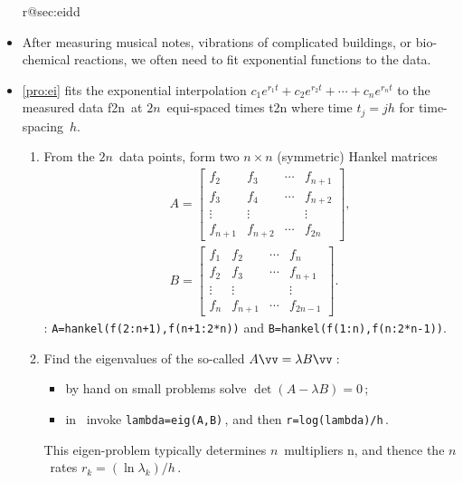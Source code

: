 \begin{itemize}
\ifcsname r@sec:eidd\endcsname%
\item After measuring musical notes, vibrations of complicated buildings, or bio-chemical reactions, we often need to fit exponential functions to the data.

\item \cref{pro:ei} fits the exponential interpolation \(c_1e^{r_1t}+c_2e^{r_2t}+\cdots+c_ne^{r_nt}\) to the measured data \hlist f{2n}\ at \(2n\)~equi-spaced times \hlist t{2n} where time \(t_j=jh\) for time-spacing~\(h\).
\begin{enumerate}
\item From the \(2n\)~data points, form two \(n\times n\) (symmetric) Hankel matrices 
\begin{eqnarray*}&&
A=\begin{bmatrix} f_2&f_3&\cdots&f_{n+1}
\\f_3&f_4&\cdots&f_{n+2}
\\\vdots&\vdots&&\vdots
\\f_{n+1}&f_{n+2}&\cdots&f_{2n} \end{bmatrix},
\\&&
B=\begin{bmatrix} f_1&f_2&\cdots&f_{n}
\\f_2&f_3&\cdots&f_{n+1}
\\\vdots&\vdots&&\vdots
\\f_{n}&f_{n+1}&\cdots&f_{2n-1} \end{bmatrix}.
\end{eqnarray*}
\script: \verb|A=hankel(f(2:n+1),f(n+1:2*n))| and \verb|B=hankel(f(1:n),f(n:2*n-1))|.

\item Find the eigenvalues of the so-called  \(A\vv=\lambda B\vv\)\,: 
\begin{itemize}
\item by hand on small problems solve \(\det(A-\lambda B)=0\)\,;
\item in \script\ invoke \verb|lambda=eig(A,B)|\,, and then \verb|r=log(lambda)/h|\,.
\end{itemize}
This eigen-problem typically determines \(n\)~multipliers \hlist\lambda n, and thence the \(n\)~rates \(r_k=(\ln\lambda_k)/h\)\,.


\end{enumerate}
\end{itemize}
